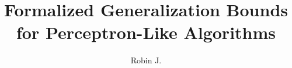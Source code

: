 \documentclass[numbered,pdftex]{ohio-etd}
\title     {Formalized Generalization Bounds for Perceptron-Like Algorithms}
\author    {Robin J.}{Kelby}
\begin{document}
 

\makefrontmatter    %




 





\end{document}

